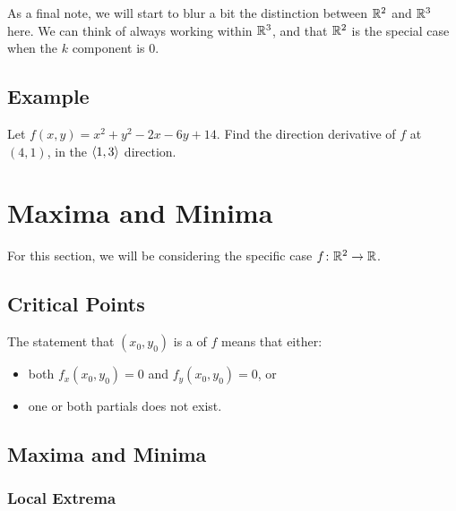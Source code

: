 As a final note, we will start to blur a bit the distinction between \(\mathbb{R}^{2}\) and \(\mathbb{R}^{3}\) here. We can think of always working within \(\mathbb{R}^{3}\), and that \(\mathbb{R}^{2}\) is the special case when the \(k\) component is 0.

\subsection{Example}

Let \(f(x,y) = x^{2} + y^{2} - 2x - 6y + 14\). Find the direction derivative of \(f\) at \((4,1)\), in the \(\left\langle 1,3 \right\rangle\) direction. \\


\newpage

\section{Maxima and Minima}

For this section, we will be considering the specific case \(f \colon \mathbb{R}^{2} \to \mathbb{R}\).

\subsection{Critical Points}

The statement that \((x_{0}, y_{0})\) is a  of \(f\) means that either:
\begin{itemize}
    \item both \(f_{x}(x_{0}, y_{0}) = 0\) and \(f_{y}(x_{0}, y_{0}) = 0\), or
    \item one or both partials does not exist.
\end{itemize}

\subsection{Maxima and Minima}

\subsubsection{Local Extrema}


